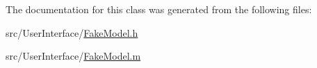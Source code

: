 The documentation for this class was generated from the following files\-:\begin{DoxyCompactItemize}
\item 
src/\-User\-Interface/\hyperlink{_fake_model_8h}{Fake\-Model.\-h}\item 
src/\-User\-Interface/\hyperlink{_fake_model_8m}{Fake\-Model.\-m}\end{DoxyCompactItemize}
